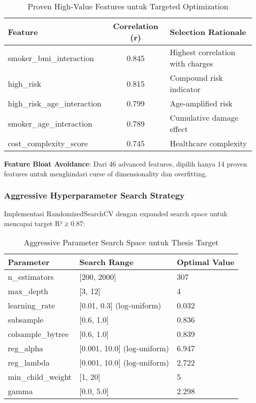 \begin{table}[H]
\centering
\caption{Proven High-Value Features untuk Targeted Optimization}
\label{tab:proven-features}
\begin{tabular}{|l|c|l|}
\hline
\textbf{Feature} & \textbf{Correlation (r)} & \textbf{Selection Rationale} \\
\hline
smoker\_bmi\_interaction & 0.845 & Highest correlation with charges \\
high\_risk & 0.815 & Compound risk indicator \\
high\_risk\_age\_interaction & 0.799 & Age-amplified risk \\
smoker\_age\_interaction & 0.789 & Cumulative damage effect \\
cost\_complexity\_score & 0.745 & Healthcare complexity \\
\hline
\end{tabular}
\end{table}

\textbf{Feature Bloat Avoidance}: Dari 46 advanced features, dipilih hanya 14 proven features untuk menghindari curse of dimensionality dan overfitting.

\subsubsection{Aggressive Hyperparameter Search Strategy}
Implementasi RandomizedSearchCV dengan expanded search space untuk mencapai target R² ≥ 0.87:

\begin{table}[H]
\centering
\caption{Aggressive Parameter Search Space untuk Thesis Target}
\label{tab:aggressive-search-space}
\begin{tabular}{|l|l|l|}
\hline
\textbf{Parameter} & \textbf{Search Range} & \textbf{Optimal Value} \\
\hline
n\_estimators & [200, 2000] & 307 \\
max\_depth & [3, 12] & 4 \\
learning\_rate & [0.01, 0.3] (log-uniform) & 0.032 \\
subsample & [0.6, 1.0] & 0.836 \\
colsample\_bytree & [0.6, 1.0] & 0.839 \\
reg\_alpha & [0.001, 10.0] (log-uniform) & 6.947 \\
reg\_lambda & [0.001, 10.0] (log-uniform) & 2.722 \\
min\_child\_weight & [1, 20] & 5 \\
gamma & [0.0, 5.0] & 2.298 \\
\hline
\end{tabular}
\end{table}

